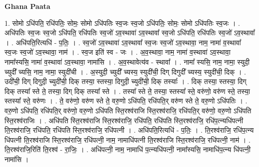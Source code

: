 \documentclass[17pt]{extarticle}
\begin{document}
\textbf{Ghana Paata } \newline

1. सोमो ऽधि॑पति॒ रधि॑पतिः॒ सोमः॒ सोमो ऽधि॑पतिः स्व॒जः स्व॒जो ऽधि॑पतिः॒ सोमः॒ सोमो ऽधि॑पतिः स्व॒जः । . अधि॑पतिः स्व॒जः स्व॒जो ऽधि॑पति॒ रधि॑पतिः स्व॒जो॑ ऽव॒स्थावा॑ ऽव॒स्थावा᳚ स्व॒जो ऽधि॑पति॒ रधि॑पतिः स्व॒जो॑ ऽव॒स्थावा᳚ । . अधि॑पति॒रित्यधि॑ - प॒तिः॒ । . स्व॒जो॑ ऽव॒स्थावा॑ ऽव॒स्थावा᳚ स्व॒जः स्व॒जो॑ ऽव॒स्थावा॒ नाम॒ नामा॑ व॒स्थावा᳚ स्व॒जः स्व॒जो॑ 
ऽव॒स्थावा॒॒ नाम॑ । . स्व॒ज इति॑ स्व - जः । . अ॒व॒स्थावा॒ नाम॒ नामा॑ व॒स्थावा॑ ऽव॒स्थावा॒ नामा᳚स्यसि॒ नामा॑ व॒स्थावा॑ ऽव॒स्थावा॒ नामा॑सि । . अ॒व॒स्थावेत्य॑व - स्थावा᳚ । . नामा᳚ स्यसि॒ नाम॒ नामा॒ स्युदी॒ च्युदी᳚ च्यसि॒ नाम॒ नामा॒ स्युदी॑ची । . अ॒स्युदी॒ च्युदी᳚ च्यस्य॒ स्युदी॑ची॒ दिग् दिगुदी᳚ च्यस्य॒ स्युदी॑ची॒ दिक् । . उदी॑ची॒ दिग् दिगुदी॒ च्युदी॑ची॒ दिक् तस्या॒ स्तस्या॒ दिगुदी॒ च्युदी॑ची॒ दिक् तस्याः᳚ । . दिक् तस्या॒ स्तस्या॒ दिग् दिक् तस्या᳚ स्ते ते॒ तस्या॒ दिग् दिक् तस्या᳚ स्ते । . तस्या᳚ स्ते ते॒ तस्या॒ स्तस्या᳚ स्ते॒ वरु॑णो॒ वरु॑ण स्ते॒ तस्या॒ स्तस्या᳚ स्ते॒ वरु॑णः । . ते॒ वरु॑णो॒ वरु॑ण स्ते ते॒ वरु॒णो ऽधि॑पति॒ रधि॑पति॒र् वरु॑ण स्ते ते॒ वरु॒णो ऽधि॑पतिः । . वरु॒णो ऽधि॑पति॒ रधि॑पति॒र् वरु॑णो॒ वरु॒णो ऽधि॑पति स्ति॒रश्व॑राजि स्ति॒रश्व॑राजि॒ रधि॑पति॒र् वरु॑णो॒ वरु॒णो ऽधि॑पति स्ति॒रश्व॑राजिः । . अधि॑पति स्ति॒रश्व॑राजि स्ति॒रश्व॑राजि॒ रधि॑पति॒ रधि॑पति स्ति॒रश्व॑राजि॒ रधि॑प॒त्न्यधि॑पत्नी ति॒रश्व॑राजि॒ रधि॑पति॒ रधि॑पति स्ति॒रश्व॑राजि॒ रधि॑पत्नी । . अधि॑पति॒रित्यधि॑ - प॒तिः॒ । . ति॒रश्व॑राजि॒ रधि॑प॒त्न्य धि॑पत्नी ति॒रश्व॑राजि स्ति॒रश्व॑राजि॒ रधि॑पत्नी॒ नाम॒ नामाधि॑पत्नी ति॒रश्व॑राजि स्ति॒रश्व॑राजि॒ रधि॑पत्नी॒ नाम॑ । . ति॒रश्व॑राजि॒रिति॑ ति॒रश्व॑ - रा॒जिः॒ । . अधि॑पत्नी॒ नाम॒ नामाधि॑ प॒त्न्यधि॑पत्नी॒ नामा᳚स्यसि॒ नामाधि॑प॒त्न्य धि॑पत्नी॒ नामा॑सि । \newline
\end{document}
